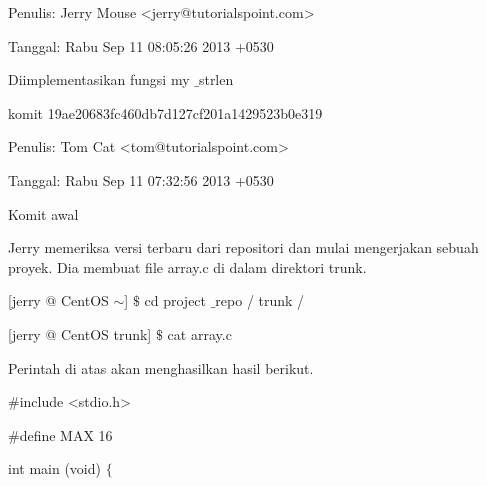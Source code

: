 \noindent 
 \hspace*{0.5in} Penulis: Jerry Mouse <jerry@tutorialspoint.com> \par
\noindent 
 \hspace*{0.5in} Tanggal: Rabu Sep 11 08:05:26 2013 +0530 \par
\noindent 
 \hspace*{0.5in} Diimplementasikan fungsi my $  \_  $strlen \par
\vspace{12pt}
\noindent 
 \hspace*{0.5in}  \hspace*{0.5in} komit 19ae20683fc460db7d127cf201a1429523b0e319 \par
\noindent 
 \hspace*{0.5in}  \hspace*{0.5in} Penulis: Tom Cat <tom@tutorialspoint.com> \par
\noindent 
 \hspace*{0.5in}  \hspace*{0.5in} Tanggal: Rabu Sep 11 07:32:56 2013 +0530 \par
\vspace{12pt}
\vspace{12pt}
\vspace{12pt}
\noindent 
Komit awal \par
\noindent 
 \hspace*{0.5in} Jerry memeriksa versi terbaru dari repositori dan mulai mengerjakan sebuah proyek. Dia  \hspace*{0.5in} membuat file array.c di dalam direktori trunk. \par
\noindent 
 \hspace*{0.5in} [jerry @ CentOS  $  \sim  $]  $  \$  $ cd project $  \_  $repo / trunk / \par
\noindent 
 \hspace*{0.5in} [jerry @ CentOS trunk]  $  \$  $ cat array.c \par
\noindent 
 \hspace*{0.5in} Perintah di atas akan menghasilkan hasil berikut. \par
\noindent 
 \hspace*{0.5in}  $  \#  $include <stdio.h> \par
\noindent 
 \hspace*{0.5in}  $  \#  $define MAX 16 \par
\noindent 
 \hspace*{0.5in} int main (void)  $  \{  $ \par
